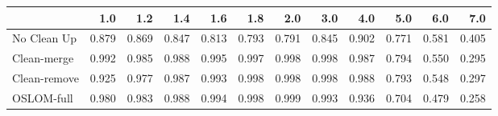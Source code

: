 \begin{tabular}{lrrrrrrrrrrr}
\toprule
{} &   1.0 &   1.2 &   1.4 &   1.6 &   1.8 &   2.0 &   3.0 &   4.0 &   5.0 &   6.0 &   7.0 \\
\midrule
No Clean Up  & 0.879 & 0.869 & 0.847 & 0.813 & 0.793 & 0.791 & 0.845 & 0.902 & 0.771 & 0.581 & 0.405 \\
Clean-merge  & 0.992 & 0.985 & 0.988 & 0.995 & 0.997 & 0.998 & 0.998 & 0.987 & 0.794 & 0.550 & 0.295 \\
Clean-remove & 0.925 & 0.977 & 0.987 & 0.993 & 0.998 & 0.998 & 0.998 & 0.988 & 0.793 & 0.548 & 0.297 \\
OSLOM-full   & 0.980 & 0.983 & 0.988 & 0.994 & 0.998 & 0.999 & 0.993 & 0.936 & 0.704 & 0.479 & 0.258 \\
\bottomrule
\end{tabular}
